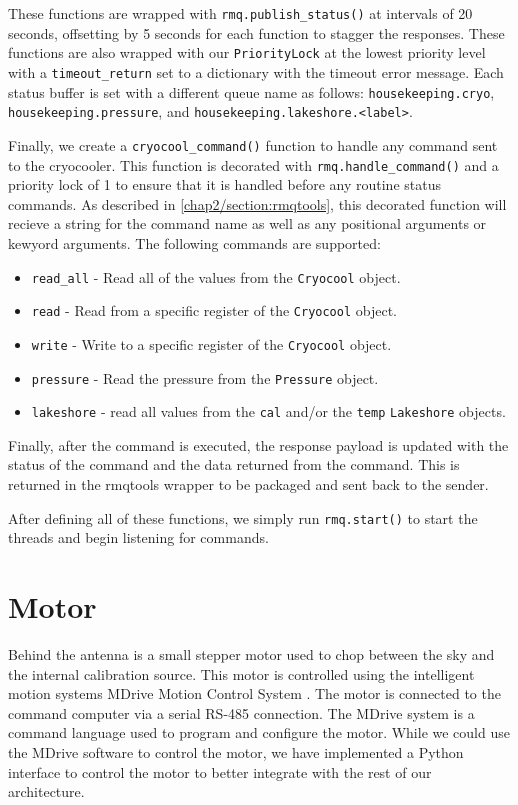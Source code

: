 These functions are wrapped with \texttt{rmq.publish\_status()} at intervals of 20 seconds, offsetting by 5 seconds for each function to stagger the responses. 
These functions are also wrapped with our \texttt{PriorityLock} at the lowest priority level with a \texttt{timeout\_return} set to a dictionary with the timeout error message.
Each status buffer is set with a different queue name as follows: \texttt{housekeeping.cryo}, \texttt{housekeeping.pressure}, and \texttt{housekeeping.lakeshore.<label>}.

Finally, we create a \texttt{cryocool\_command()} function to handle any command sent to the cryocooler.
This function is decorated with \texttt{rmq.handle\_command()} and a priority lock of 1 to ensure that it is handled before any routine status commands.
As described in \ref{chap2/section:rmqtools}, this decorated function will recieve a string for the command name as well as any positional arguments or kewyord arguments.
The following commands are supported:

\begin{itemize}
    \item \texttt{read\_all} - Read all of the values from the \texttt{Cryocool} object. 
    \item \texttt{read} - Read from a specific register of the \texttt{Cryocool} object.
    \item \texttt{write} - Write to a specific register of the \texttt{Cryocool} object.
    \item \texttt{pressure} - Read the pressure from the \texttt{Pressure} object.
    \item \texttt{lakeshore} - read all values from the \texttt{cal} and/or the \texttt{temp} \texttt{Lakeshore} objects.
\end{itemize}

Finally, after the command is executed, the response payload is updated with the status of the command and the data returned from the command.
This is returned in the rmqtools wrapper to be packaged and sent back to the sender.

After defining all of these functions, we simply run \texttt{rmq.start()} to start the threads and begin listening for commands.

\section{Motor}
Behind the antenna is a small stepper motor used to chop between the sky and the internal calibration source.
This motor is controlled using the intelligent motion systems MDrive Motion Control System \citep{mdrive}.
The motor is connected to the command computer via a serial RS-485 connection. 
The MDrive system is a command language used to program and configure the motor.
While we could use the MDrive software to control the motor, we have implemented a Python interface to control the motor to better integrate with the rest of our architecture. 

